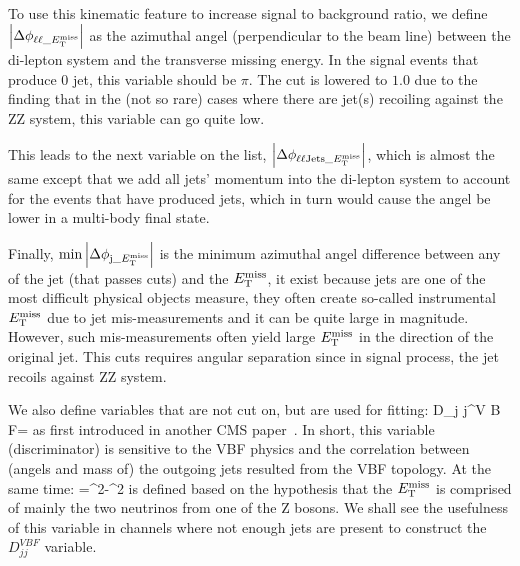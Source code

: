 To use this kinematic feature to increase signal to background ratio, we define 
$\abs{\Delta\phi_{\ell\ell\_E_{\mathrm{T}}^{\mathrm{miss}}}}$ as the azimuthal angel (perpendicular to 
the beam line) between the di-lepton system and the transverse missing energy. In the
signal events that produce 0 jet, this variable should be $\pi$. The cut is lowered to $1.0$ 
due to the finding that in the (not so rare) cases where there are jet(s) recoiling against
the ZZ system, this variable can go quite low.

This leads to the next variable on the list, $\abs{\Delta\phi_{\ell\ell\mathrm{Jets}\_E_{\mathrm{T}}^{\mathrm{miss}}}}$, which
is almost the same except that we add all jets' momentum into the di-lepton system to account
for the events that have produced jets, which in turn would cause the angel be lower in
a multi-body final state.


Finally, $\min{\abs{ \Delta\phi_{\mathrm{j}\_E_{\mathrm{T}}^{\mathrm{miss}}}}}$ is the minimum azimuthal angel difference between
any of the jet (that passes cuts) and the $E_{\mathrm{T}}^{\mathrm{miss}}$, it exist because jets are one of the 
most difficult physical objects measure, they often create so-called instrumental $E_{\mathrm{T}}^{\mathrm{miss}}$ due to jet
mis-measurements and it can be quite large in magnitude. However, such mis-measurements often yield large
$E_{\mathrm{T}}^{\mathrm{miss}}$ in the direction of the original jet. This cuts requires angular separation since in signal process,
the jet recoils against ZZ system.

We also define variables that are not cut on, but are used for fitting:
\be
D_{j j}^{V B F}=
\ee
as first introduced in another CMS paper~\cite{djjvbf}. In short, this variable (discriminator) is sensitive
to the VBF physics and the correlation between (angels and mass of) the outgoing jets resulted from the
VBF topology. At the same time:
\be
\mtzz={}^2-^{2}
\ee
is defined based on the hypothesis that the $E_{\mathrm{T}}^{\mathrm{miss}}$ is comprised of mainly the two neutrinos
from one of the Z bosons. We shall see the usefulness of this variable in channels where
not enough jets are present to construct the $D_{j j}^{V B F}$ variable.

